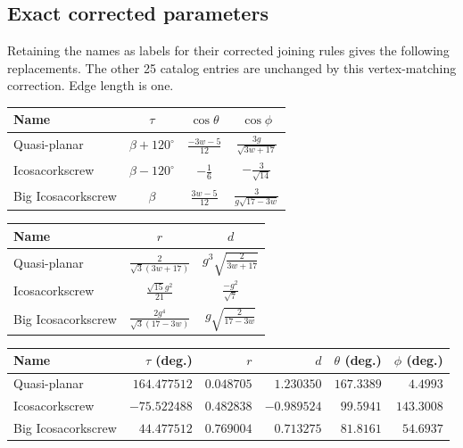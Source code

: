 \documentclass[11pt]{article}
\theoremstyle{definition}
\newcommand{\degc}{^{\circ}}
\begin{document}
\subsection{Exact corrected parameters}
Retaining the names as labels for their corrected joining rules gives the
following replacements. The other 25 catalog entries are unchanged by this
vertex-matching correction. Edge length is one.
\begin{center}
\small\renewcommand{\arraystretch}{1.55}
\begin{tabular}{@{}lccc@{}}
\toprule
Name & $\tau$ & $\cos\theta$ & $\cos\phi$\\
\midrule
Quasi-planar & $\beta+120\degc$ & $\displaystyle \frac{- 3 w - 5}{12}$ & $\displaystyle \frac{3 g}{\sqrt{3 w + 17}}$\\
Icosacorkscrew & $\beta-120\degc$ & $\displaystyle - \frac{1}{6}$ & $\displaystyle - \frac{3}{\sqrt{14}}$\\
Big Icosacorkscrew & $\beta$ & $\displaystyle \frac{3 w - 5}{12}$ & $\displaystyle \frac{3}{g \sqrt{17 - 3 w}}$\\
\bottomrule
\end{tabular}
\end{center}
\begin{center}
\small\renewcommand{\arraystretch}{1.6}
\begin{tabular}{@{}lcc@{}}
\toprule
Name & $r$ & $d$\\
\midrule
Quasi-planar & $\displaystyle \frac{2}{\sqrt{3} \left(3 w + 17\right)}$ & $\displaystyle g^{3} \sqrt{\frac{2}{3 w + 17}}$\\
Icosacorkscrew & $\displaystyle \frac{\sqrt{15} g^{2}}{21}$ & $\displaystyle \frac{- g^{2}}{\sqrt{7}}$\\
Big Icosacorkscrew & $\displaystyle \frac{2 g^{4}}{\sqrt{3} \left(17 - 3 w\right)}$ & $\displaystyle g \sqrt{\frac{2}{17 - 3 w}}$\\
\bottomrule
\end{tabular}
\end{center}
\begin{center}
\small\renewcommand{\arraystretch}{1.3}
\begin{tabular}{@{}lrrrrr@{}}
\toprule
Name & $\tau$ (deg.) & $r$ & $d$ & $\theta$ (deg.) & $\phi$ (deg.)\\
\midrule
Quasi-planar & $164.477512$ & $0.048705$ & $1.230350$ & $167.3389$ & $4.4993$\\
Icosacorkscrew & $-75.522488$ & $0.482838$ & $-0.989524$ & $99.5941$ & $143.3008$\\
Big Icosacorkscrew & $44.477512$ & $0.769004$ & $0.713275$ & $81.8161$ & $54.6937$\\
\bottomrule
\end{tabular}
\end{center}
\end{document}
